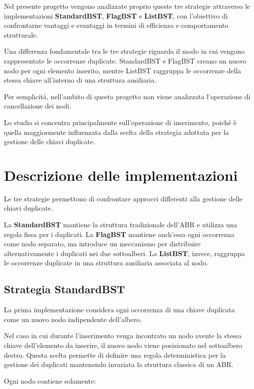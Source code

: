 \documentclass[a4paper,12pt]{article}
\begin{document}
Nel presente progetto vengono analizzate proprio queste tre strategie attraverso le implementazioni \textbf{StandardBST}, \textbf{FlagBST} e \textbf{ListBST}, con l'obiettivo di confrontarne vantaggi e svantaggi in termini di efficienza e comportamento strutturale.

Una differenza fondamentale tra le tre strategie riguarda il modo in cui vengono rappresentate le occorrenze duplicate. StandardBST e FlagBST creano un nuovo nodo per ogni elemento inserito, mentre ListBST raggruppa le occorrenze della stessa chiave all'interno di una struttura ausiliaria.

Per semplicità, nell'ambito di questo progetto non viene analizzata l'operazione di cancellazione dei nodi.

Lo studio si concentra principalmente sull'operazione di inserimento, poiché è quella maggiormente influenzata dalla scelta della strategia adottata per la gestione delle chiavi duplicate.

\section{Descrizione delle implementazioni}

Le tre strategie permettono di confrontare approcci differenti alla gestione delle chiavi duplicate.

La \textbf{StandardBST} mantiene la struttura tradizionale dell'ABR e utilizza una regola fissa per i duplicati. La \textbf{FlagBST} mantiene anch'essa ogni occorrenza come nodo separato, ma introduce un meccanismo per distribuire alternativamente i duplicati nei due sottoalberi. La \textbf{ListBST}, invece, raggruppa le occorrenze duplicate in una struttura ausiliaria associata al nodo.

\subsection{Strategia StandardBST}

La prima implementazione considera ogni occorrenza di una chiave duplicata come un nuovo nodo indipendente dell'albero.

Nel caso in cui durante l'inserimento venga incontrato un nodo avente la stessa chiave dell'elemento da inserire, il nuovo nodo viene posizionato nel sottoalbero destro. Questa scelta permette di definire una regola deterministica per la gestione dei duplicati mantenendo invariata la struttura classica di un ABR.

Ogni nodo contiene solamente:
\end{document}
